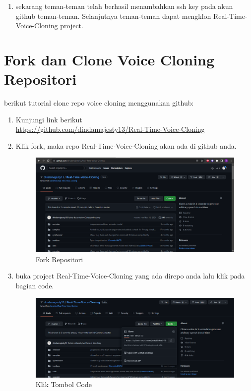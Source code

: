 \begin{enumerate}
\item sekarang teman-teman telah berhasil menambahkan ssh key pada akun github teman-teman. Selanjutnya teman-teman dapat mengklon Real-Time-Voice-Cloning project.

\end{enumerate}

\section{Fork dan Clone Voice Cloning Repositori}
berikut tutorial clone repo voice cloning menggunakan github:
\begin{enumerate}
\item Kunjungi link berikut \\ \url{https://github.com/dindamajesty13/Real-Time-Voice-Cloning}
\item Klik fork, maka repo Real-Time-Voice-Cloning akan ada di github anda.
\begin{figure}[H]
\centering
\includegraphics[scale=.3]{figures/repo}
\caption{Fork Repositori}
\label{repo1}
\end{figure}

\item buka project Real-Time-Voice-Cloning yang ada direpo anda lalu klik pada bagian code.
\begin{figure}[H]
\centering
\includegraphics[scale=.3]{figures/repo1}
\caption{Klik Tombol Code}
\label{repo2}
\end{figure}


\end{enumerate}
